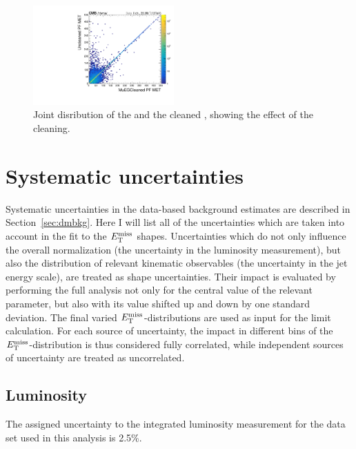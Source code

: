 \begin{figure}[hbtp]
  \centering
  \includegraphics[width=0.48\textwidth]{figures/ll_metAltVsUncleaned.pdf}
  \caption{
    Joint disribution of the \met and the cleaned \met, showing the effect of the cleaning.
  }
  \label{fig:met_control2}
\end{figure}

\section{Systematic uncertainties}
\label{sec:dmsyst}
Systematic uncertainties in the data-based background estimates are described 
in Section~\ref{sec:dmbkg}.
Here I will list all of the uncertainties which are taken into
account in the fit to the $E_\mathrm{T}^{\mathrm{miss}}$ shapes. 
Uncertainties which do not only influence the overall normalization
(\eg the uncertainty in the luminosity measurement), but also the
distribution of relevant kinematic observables (\eg the uncertainty in
the jet energy scale), are treated as shape uncertainties. Their
impact is evaluated by performing the full analysis not only for the
central value of the relevant parameter, but also with its value
shifted up and down by one standard deviation. The final varied
$E_\mathrm{T}^{\mathrm{miss}}$-distributions are used as input for the limit calculation. For
each source of uncertainty, the impact in different bins of the
$E_\mathrm{T}^{\mathrm{miss}}$-distribution is thus considered fully correlated, while
independent sources of uncertainty are treated as uncorrelated. 

\subsection{Luminosity}

The assigned uncertainty to the integrated luminosity measurement for
the data set used in this analysis is 2.5\%.

